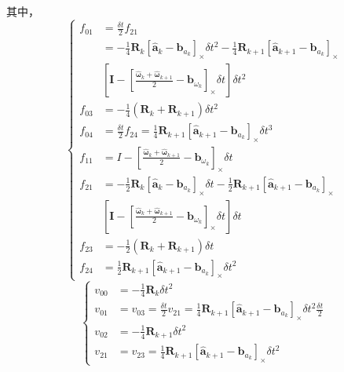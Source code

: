 其中，
\begin{equation}
\label{eqn:3.52}
\left\{
\begin{aligned}
f_{01} &= \frac{\delta t}{2} f_{21} \\
&= -\frac{1}{4} \mathbf{R}_{k}\left[\hat{\mathbf{a}}_{k}-\mathbf{b}_{a_{k}}\right]_\times \delta t^{2}-\frac{1}{4} \mathbf{R}_{k+1}\left[\hat{\mathbf{a}}_{k+1}-\mathbf{b}_{a_{k}}\right]_\times \\ 
& \left[\mathbf{I}-\left[\frac{\hat{\bm{\omega}}_{k}+\hat{\bm{\omega}}_{k+1}}{2}-\mathbf{b}_{\omega_{k}}\right]_\times \delta t\right] \delta t^{2} \\
f_{03} &= -\frac{1}{4}\left(\mathbf{R}_{k}+\mathbf{R}_{k+1}\right) \delta t^{2} \\
f_{04} &= \frac{\delta t}{2} f_{24}=\frac{1}{4} \mathbf{R}_{k+1}\left[\hat{\mathbf{a}}_{k+1}-\mathbf{b}_{a_{k}}\right]_\times \delta t^{3} \\
f_{11} &= I-\left[\frac{\hat{\bm{\omega}}_{k}+\hat{\bm{\omega}}_{k+1}}{2}-\mathbf{b}_{\omega_{k}}\right]_\times \delta t \\
f_{21} &= -\frac{1}{2} \mathbf{R}_{k}\left[\hat{\mathbf{a}}_{k}-\mathbf{b}_{a_{k}}\right]_\times \delta t-\frac{1}{2} \mathbf{R}_{k+1}\left[\hat{\mathbf{a}}_{k+1}-\mathbf{b}_{a_{k}}\right]_\times \\ 
& \left[\mathbf{I}-\left[\frac{\hat{\bm{\omega}}_{k}+\hat{\bm{\omega}}_{k+1}}{2}-\mathbf{b}_{\omega_{k}}\right]_\times \delta t\right] \delta t \\
f_{23} &= -\frac{1}{2}\left(\mathbf{R}_{k}+\mathbf{R}_{k+1}\right) \delta t \\
f_{24} &= \frac{1}{2} \mathbf{R}_{k+1}\left[\hat{\mathbf{a}}_{k+1}-\mathbf{b}_{a_{k}}\right]_\times \delta t^{2} 
\end{aligned}
\right.
\end{equation}
\begin{equation}
\label{eqn:3.53}
\left\{
\begin{aligned}
v_{00} &= -\frac{1}{4} \mathbf{R}_{k} \delta t^{2} \\
v_{01} &= v_{03}=\frac{\delta t}{2} v_{21}=\frac{1}{4} \mathbf{R}_{k+1}\left[\hat{\mathbf{a}}_{k+1}-\mathbf{b}_{a_{k}}\right]_\times \delta t^{2} \frac{\delta t}{2} \\
v_{02} &= -\frac{1}{4} \mathbf{R}_{k+1} \delta t^{2} \\
v_{21} &= v_{23}=\frac{1}{4} \mathbf{R}_{k+1}\left[\hat{\mathbf{a}}_{k+1}-\mathbf{b}_{a_{k}}\right]_\times \delta t^{2}
\end{aligned}
\right.
\end{equation}
